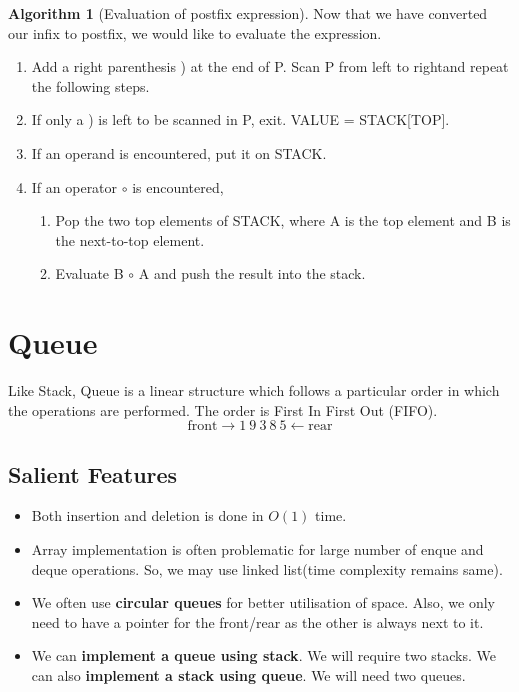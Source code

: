 \documentclass[10pt, a4paper]{extarticle}
\theoremstyle{definition}
\newtheorem{alg}{Algorithm}
\begin{document}
\begin{alg}[Evaluation of postfix expression]
	Now that we have converted our infix to postfix, we would like to evaluate the expression.
	\begin{enumerate}
		\item Add a right parenthesis ) at the end of P. Scan P from left to rightand repeat the following steps.
		\item If only a ) is left to be scanned in P, exit. VALUE = STACK[TOP].
		\item If an operand is encountered, put it on STACK.
		\item If an operator $\circ$ is encountered,
		      \begin{enumerate}
			      \item Pop the two top elements of STACK, where A is the top element and B is the next-to-top element.
			      \item Evaluate B $\circ$ A and push the result into the stack.

		      \end{enumerate}
	\end{enumerate}
\end{alg}


\section{Queue}
Like Stack, Queue is a linear structure which follows a particular order in which the operations are performed. The order is First In First Out (FIFO).
\[\boxed{\text{front}}\to1\ 9\ 3\ 8\ 5\leftarrow\boxed{\text{rear}}\]

\subsection{Salient Features}
\begin{itemize}
	\item Both insertion and deletion is done in $O(1)$ time.
	\item Array implementation is often problematic for large number of enque and deque operations. So, we may use linked list(time complexity remains same).
	\item We often use \textbf{circular queues} for better utilisation of space. Also, we only need to have a pointer for the front/rear as the other is always next to it.
	\item We can \textbf{implement a queue using stack}. We will require two stacks. We can also \textbf{implement a stack using queue}. We will need two queues.
\end{itemize}
\end{document}
